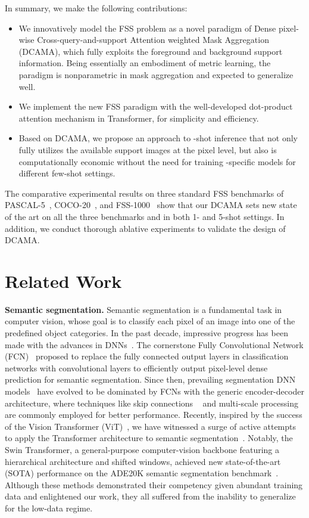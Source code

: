 \documentclass[runningheads,table,xcdraw]{llncs}
\begin{document}
In summary, we make the following contributions:\begin{itemize}
\item We innovatively model the FSS problem as a novel paradigm of Dense pixel-wise Cross-query-and-support Attention weighted Mask Aggregation (DCAMA), which fully exploits the foreground and background support information.
    Being essentially an embodiment of metric learning, the paradigm is nonparametric {\color{purple}in mask aggregation} and expected to generalize well.
\item We implement the new FSS paradigm with the well-developed dot-product attention mechanism in Transformer, for simplicity and efficiency.
\item Based on DCAMA, we propose an approach to -shot inference that not only fully utilizes the available support images at the pixel level, but also is computationally economic without the need for training -specific models for different few-shot settings.
\end{itemize}
The comparative experimental results on three standard FSS benchmarks of PASCAL-5~\cite{shaban2017one}, COCO-20~\cite{nguyen2019feature}, and FSS-1000~\cite{li2020fss} show that our DCAMA sets new state of the art on all the three benchmarks and in both 1- and 5-shot settings.
In addition, we conduct thorough ablative experiments to validate the design of DCAMA.

\section{Related Work}
\label{sec:rela}

\textbf{Semantic segmentation.}
Semantic segmentation is a fundamental task in computer vision, whose goal is to classify each pixel of an image into one of the predefined object categories.
In the past decade, impressive progress has been made with the advances in DNNs~\cite{minaee2021image,taghanaki2021deep}.
The cornerstone Fully Convolutional Network (FCN)~\cite{long2015fully} proposed to replace the fully connected output layers in classification networks with convolutional layers to efficiently output pixel-level dense prediction for semantic segmentation.
Since then, prevailing segmentation DNN models~\cite{chen2017deeplab,ronneberger2015u,zhao2017pyramid} have evolved to be dominated by FCNs with the generic encoder-decoder architecture, where
techniques like skip connections ~\cite{ronneberger2015u} and multi-scale processing~\cite{chen2018encoder,zhao2017pyramid} are commonly employed for better performance.
Recently, inspired by the success of the Vision Transformer (ViT)~\cite{dosovitskiy2020image}, we have witnessed a surge of active attempts to apply the Transformer architecture to semantic segmentation~\cite{strudel2021segmenter,zhu2021unified}.
Notably, the Swin Transformer, a general-purpose computer-vision backbone featuring a hierarchical architecture and shifted windows, achieved new state-of-the-art (SOTA) performance on the ADE20K semantic segmentation benchmark~\cite{liu2021swin}. Although these methods demonstrated their competency given abundant training data and enlightened our work, they all suffered from the inability to generalize for the low-data regime.
\end{document}
